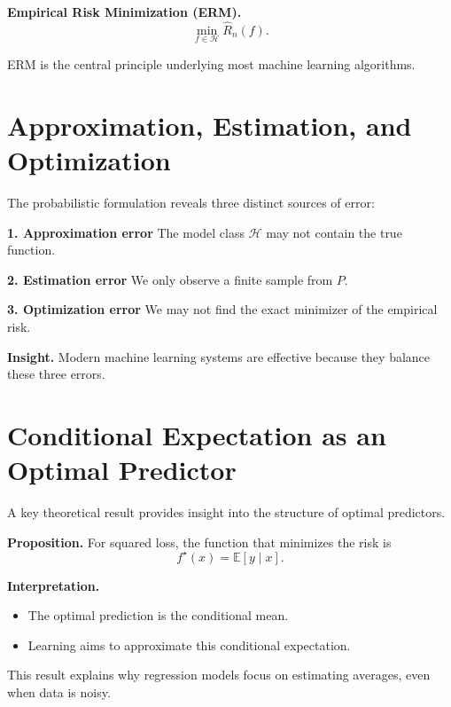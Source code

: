 \medskip

\noindent
\textbf{Empirical Risk Minimization (ERM).}
\[
\min_{f \in \mathcal{H}} \hat{R}_n(f).
\]

\medskip

ERM is the central principle underlying most machine learning algorithms.

\section{Approximation, Estimation, and Optimization}

The probabilistic formulation reveals three distinct sources of error:

\medskip

\noindent
\textbf{1. Approximation error}  
The model class $\mathcal{H}$ may not contain the true function.

\medskip

\noindent
\textbf{2. Estimation error}  
We only observe a finite sample from $P$.

\medskip

\noindent
\textbf{3. Optimization error}  
We may not find the exact minimizer of the empirical risk.

\medskip

\noindent
\textbf{Insight.}  
Modern machine learning systems are effective because they balance these three errors.

\section{Conditional Expectation as an Optimal Predictor}

A key theoretical result provides insight into the structure of optimal predictors.

\medskip

\noindent
\textbf{Proposition.}  
For squared loss, the function that minimizes the risk is
\[
f^\star(x) = \mathbb{E}[y \mid x].
\]

\medskip

\noindent
\textbf{Interpretation.}
\begin{itemize}
    \item The optimal prediction is the conditional mean.
    \item Learning aims to approximate this conditional expectation.
\end{itemize}

\medskip

\noindent
This result explains why regression models focus on estimating averages, even when data is noisy.

